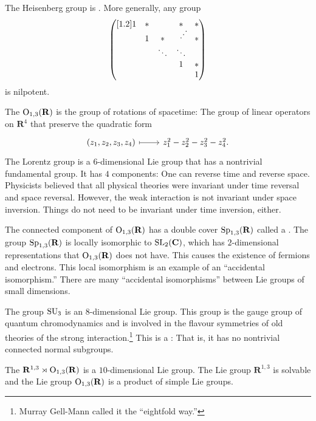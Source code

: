 \documentclass [11 pt, oneside] {article}
\begin{document}
The Heisenberg group is . More generally, any group
\begin{align*} %
	\mat{1&*&&*&*\\
		      &1&*& \hbox to .2em{\hss\scalebox{1}[1] {\rotatebox[origin=c]{90}{$\ddots$}}\hss} &*\\
		      &&\ddots&\ddots\\
		      &&&1&*\\
		      &&&&1} 
\end{align*}
is nilpotent.

The  $\operatorname{O}_{1,3}(\mathbf{R})$ is the group of rotations of spacetime: The group of linear operators on $\mathbf{R}^{4}$ that preserve the quadratic form
\[
\begin{tikzcd}
	(z_1,z_2,z_3,z_4)\ar[r,mapsto]& z_1^{2} - z_2^{2}-z_3^{2}-z_4^{2}.
\end{tikzcd}
\]
The Lorentz group is a $6$-dimensional Lie group that has a nontrivial fundamental group.
It has $4$ components: One can reverse time and reverse space.
Physicists believed that all physical theories were invariant under time reversal and space reversal. However, the weak interaction is not invariant under space inversion. Things do not need to be invariant under time inversion, either. 

The connected component of $\operatorname{O}_{1,3}(\mathbf{R})$ has a double cover $\operatorname{Sp}_{1,3}(\mathbf{R})$ called a .
The group $\operatorname{Sp}_{1,3}(\mathbf{R})$ is locally isomorphic to $\operatorname{SL}_{2}(\mathbf{C})$, which has $2$-dimensional representations that $\operatorname{O}_{1,3}(\mathbf{R})$ does not have. This causes the existence of fermions and electrons.
This local isomorphism is an example of an ``accidental isomorphism.'' There are many ``accidental isomorphisms'' between Lie groups of small dimensions.

The group $\operatorname{SU}_3$ is an $8$-dimensional Lie group. This group is the gauge group of quantum chromodynamics and is involved in the flavour symmetries of old theories of the strong interaction.\footnote{Murray Gell-Mann called it the ``eightfold way.''}
This is a : That is, it has no nontrivial connected normal subgroups.

The  $\mathbf{R}^{1,3} \rtimes \operatorname{O}_{1,3}(\mathbf{R})$ is a $10$-dimensional Lie group.
The Lie group $\mathbf{R}^{1,3}$ is solvable and the Lie group $\operatorname{O}_{1,3}(\mathbf{R})$ is a product of simple Lie groups.
\end{document}
